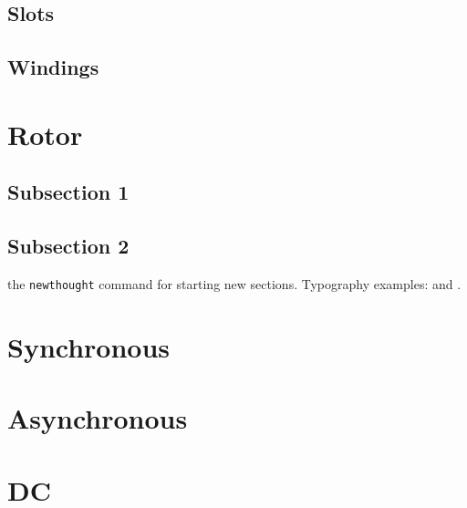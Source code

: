 \documentclass{tufte-book} %
\begin{document}
\subsection{Slots}

\subsection{Windings}

\section{Rotor}

\begin{fullwidth}
\lipsum[5]
\end{fullwidth}

\subsection{Subsection 1}

\lipsum[6-7]

\subsection{Subsection 2}

\lipsum[7-8]


 the \texttt{newthought} command for starting new sections. Typography examples:  and .


\section{Synchronous}

\section{Asynchronous}

\section{DC}

\lipsum[1] 
\end{document}
